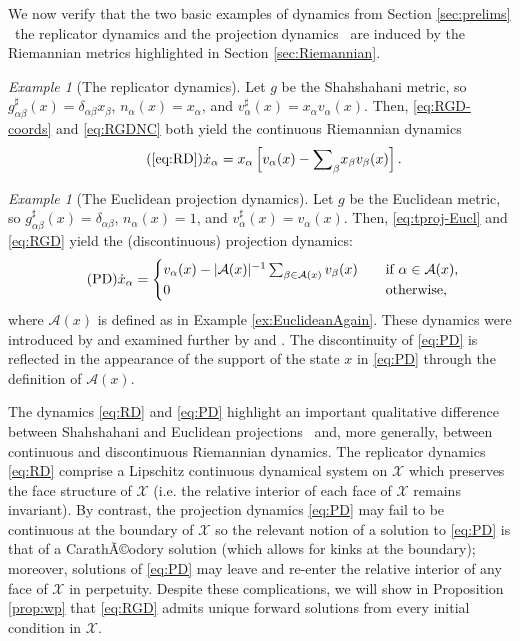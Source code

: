 \documentclass[reqno]{amsart}
\DeclarePairedDelimiter{\abs}{\lvert}{\rvert}
\theoremstyle{plain}
\theoremstyle{definition}
\theoremstyle{remark}
\newtheorem{example}[theorem]{Example}
\numberwithin{equation}{section}
\numberwithin{theorem}{section}
\begin{document}
We now verify that the two basic examples of dynamics from Section \ref{sec:prelims} \textendash\ the replicator dynamics and the projection dynamics \textendash\ are induced by the Riemannian metrics highlighted in Section \ref{sec:Riemannian}.
\begin{example}
[The replicator dynamics]
\label{ex:RDAgain}
Let $g$ be the Shahshahani metric, so $g^\sharp_{\alpha\beta}(x) = \delta_{\alpha\beta}x_{\beta}$, ${n}_{\alpha}(x) = x_{\alpha}$, and ${v}^{\sharp}_{\alpha}(x)=x_{\alpha} {v}_{\alpha}(x)$.
Then, \eqref{eq:RGD-coords} and \eqref{eq:RGDNC} both yield the continuous Riemannian dynamics
\begin{equation}
\tag{\ref*{eq:RD}}
\dot x_{\alpha}
	= x_{\alpha} \left[ {v}_{\alpha}(x) - {\sum\nolimits}_{\beta} x_{\beta} {v}_{\beta}(x) \right].
\end{equation}
\end{example}

\begin{example}
[The Euclidean projection dynamics]
\label{ex:PD}
Let $g$ be the Euclidean metric, so $g_{\alpha\beta}^{\sharp}(x) = \delta_{\alpha\beta}$, ${n}_{\alpha}(x) = 1$, and ${v}^{\sharp}_{\alpha}(x)={v}_{\alpha}(x)$.
Then, \eqref{eq:tproj-Eucl} and \eqref{eq:RGD} yield the (discontinuous) projection dynamics:
\begin{equation}
\label{eq:PD}
\tag{PD}
\dot x_{\alpha}
	= \begin{cases}
	{v}_{\alpha}(x) - \abs{{\mathcal{A}}(x)}^{-1} \sum_{\beta\in{\mathcal{A}}(x)} {v}_{\beta}(x)
		&\quad
		\text{if $\alpha\in{\mathcal{A}}(x)$,}
		\\
	0
		&\quad
		\text{otherwise,}
	\end{cases}
\end{equation}
where ${\mathcal{A}}(x)$ is defined as in Example \ref{ex:EuclideanAgain}.
These dynamics were introduced by \cite{NZ97} and examined further by \citealp{LS08} and \citealp{SDL08}.
The discontinuity of \eqref{eq:PD} is reflected in the appearance of the support of the state $x$ in \eqref{eq:PD} through the definition of ${\mathcal{A}}(x)$.\end{example}

The dynamics \eqref{eq:RD} and \eqref{eq:PD} highlight an important qualitative difference between Shahshahani and Euclidean projections \textendash\ and, more generally, between continuous and discontinuous Riemannian dynamics.
The replicator dynamics \eqref{eq:RD} comprise a Lipschitz continuous dynamical system on ${\mathcal{X}}$ which preserves the face structure of ${\mathcal{X}}$ (i.e. the relative interior of each face of ${\mathcal{X}}$ remains invariant).
By contrast, the projection dynamics \eqref{eq:PD} may fail to be continuous at the boundary of ${\mathcal{X}}$ so the relevant notion of a solution to \eqref{eq:PD} is that of a CarathÃ©odory solution (which allows for kinks at the boundary);
moreover, solutions of \eqref{eq:PD} may leave and re-enter the relative interior of any face of ${\mathcal{X}}$ in perpetuity.
Despite these complications, we will show in Proposition \ref{prop:wp} that \eqref{eq:RGD} admits unique forward solutions from every initial condition in ${\mathcal{X}}$.
\end{document}
